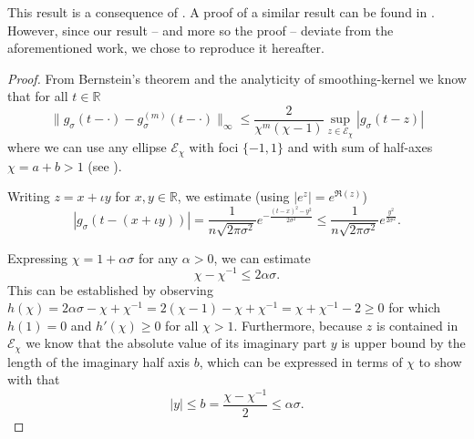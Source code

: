 This result is a consequence of .
A proof of a similar result can be found in \cite[theorem~2]{lin2017randomized}.
However, since our result -- and more so the proof -- deviate from the aforementioned
work, we chose to reproduce it hereafter.
\begin{proof}
    From Bernstein's theorem 
    and the analyticity of \gls{smoothing-kernel} we know that for all $t \in \mathbb{R}$
    \begin{equation}
        \lVert g_{\sigma}(t - \cdot) - g_{\sigma}^{(m)}(t - \cdot) \rVert _{\infty}
        \leq \frac{2}{\chi^{m}(\chi - 1)} \sup_{z \in \mathcal{E}_{\chi}} |g_{\sigma}(t - z)|
        \label{equ:2-chebyshev-convergence-proof-base}
    \end{equation}
    where we can use any ellipse $\mathcal{E}_{\chi}$
    with foci $\{-1, 1\}$ and with sum of half-axes $\chi = a + b > 1$
    (see ).

    Writing $z = x + \iota y$ for $x,y \in \mathbb{R}$, we estimate (using $|e^z| = e^{\Re(z)}$)
    \begin{equation}
        |g_{\sigma}(t - (x + \iota y))| %
        = \frac{1}{n \sqrt{2 \pi \sigma^2}} e^{- \frac{(t - x)^2 - y^2}{2 \sigma^2}}
        \leq \frac{1}{n \sqrt{2 \pi \sigma^2}} e^{\frac{y^2}{2 \sigma^2}}.
    \end{equation}

    Expressing $\chi = 1 + \alpha \sigma$ for any $\alpha > 0$,
    we can estimate
    \begin{equation}
        \chi - \chi^{-1} \leq 2\alpha\sigma.
        \label{equ:2-chebyshev-bernstein-proof-estimate}
    \end{equation}
    This can be established by observing
    $h(\chi) = 2\alpha\sigma - \chi + \chi^{-1} = 2(\chi - 1) - \chi + \chi^{-1} = \chi + \chi^{-1} - 2 \geq 0$
    for which $h(1) = 0$ and $h'(\chi) \geq 0$ for all $\chi > 1$.
    Furthermore, because $z$ is
    contained in $\mathcal{E}_{\chi}$ we know that the absolute value of its
    imaginary part $y$ is upper bound by the length of the imaginary half axis $b$,
    which can be expressed in terms of $\chi$ to show with 
    that
    \begin{equation}
        |y| \leq b = \frac{\chi - \chi^{-1}}{2} \leq \alpha\sigma.
    \end{equation}


\end{proof}
